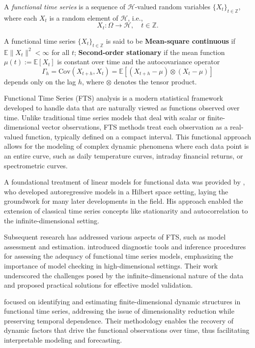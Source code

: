 \documentclass[article]{abntex2}
\begin{document}
A \emph{functional time series} is a sequence of $\mathcal{H}$-valued random variables $\{X_t\}_{t \in \mathbb{Z}}$, where each $X_t$ is a random element of $\mathcal{H}$, i.e.,
\[
X_t : \Omega \to \mathcal{H}, \quad t \in \mathbb{Z}.
\]

A functional time series $\{X_t\}_{t \in \mathbb{Z}}$ is said to be \textbf{Mean-square continuous} if $\mathbb{E}\|X_t\|^2 < \infty$ for all $t$; \textbf{Second-order stationary} if the mean function $\mu(t) := \mathbb{E}[X_t]$ is constant over time and the autocovariance operator 
    \[
    \Gamma_h = \text{Cov}(X_{t+h}, X_t) = \mathbb{E}[(X_{t+h} - \mu) \otimes (X_t - \mu)]
    \]
    depends only on the lag $h$, where $\otimes$ denotes the tensor product.


Functional Time Series (FTS) analysis is a modern statistical framework developed to handle data that are naturally viewed as functions observed over time. Unlike traditional time series models that deal with scalar or finite-dimensional vector observations, FTS methods treat each observation as a real-valued function, typically defined on a compact interval. This functional approach allows for the modeling of complex dynamic phenomena where each data point is an entire curve, such as daily temperature curves, intraday financial returns, or spectrometric curves.

A foundational treatment of linear models for functional data was provided by , who developed autoregressive models in a Hilbert space setting, laying the groundwork for many later developments in the field. His approach enabled the extension of classical time series concepts like stationarity and autocorrelation to the infinite-dimensional setting.

Subsequent research has addressed various aspects of FTS, such as model assessment and estimation.  introduced diagnostic tools and inference procedures for assessing the adequacy of functional time series models, emphasizing the importance of model checking in high-dimensional settings. Their work underscored the challenges posed by the infinite-dimensional nature of the data and proposed practical solutions for effective model validation.

 focused on identifying and estimating finite-dimensional dynamic structures in functional time series, addressing the issue of dimensionality reduction while preserving temporal dependence. Their methodology enables the recovery of dynamic factors that drive the functional observations over time, thus facilitating interpretable modeling and forecasting.
\end{document}
